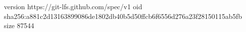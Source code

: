 version https://git-lfs.github.com/spec/v1
oid sha256:a881c2d13163899086de1802db40b5d50ffcb6f6556d276a23f28150115ab5fb
size 87544
